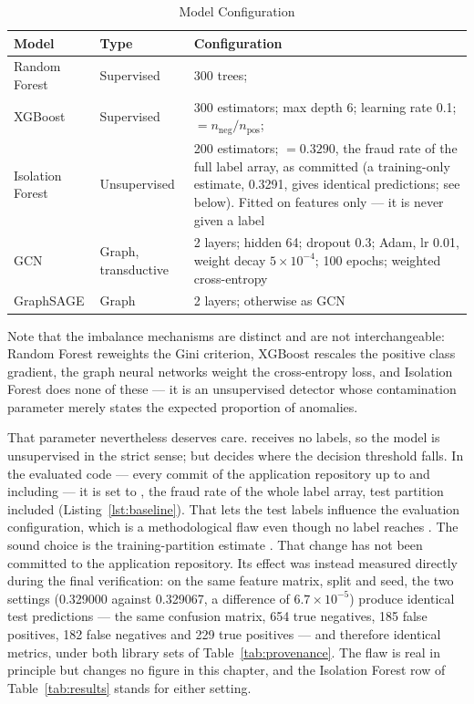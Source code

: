 \begin{table}[htbp]
\centering
\caption{Model Configuration}
\label{tab:modelconfig}
\small
\begin{tabularx}{\textwidth}{@{}L{2.7cm}L{3.0cm}Y@{}}
\toprule
\textbf{Model} & \textbf{Type} & \textbf{Configuration} \\
\midrule
Random Forest & Supervised & 300 trees;  \\
XGBoost & Supervised & 300 estimators; max depth 6; learning rate 0.1;  $= n_{\mathrm{neg}}/n_{\mathrm{pos}}$;  \\
Isolation Forest & Unsupervised & 200 estimators;  $= 0.3290$, the fraud rate of the full label array, as committed (a training-only estimate, 0.3291, gives identical predictions; see below). Fitted on features only --- it is never given a label \\
GCN & Graph, transductive & 2  layers; hidden 64; dropout 0.3; Adam, lr 0.01, weight decay $5\times10^{-4}$; 100 epochs; weighted cross-entropy \\
GraphSAGE & Graph & 2  layers; otherwise as GCN \\
\bottomrule
\end{tabularx}
\end{table}

Note that the imbalance mechanisms are distinct and are not interchangeable: Random Forest reweights the Gini criterion, XGBoost rescales the positive class gradient, the graph neural networks weight the cross-entropy loss, and Isolation Forest does none of these --- it is an unsupervised detector whose contamination parameter merely states the expected proportion of anomalies.

That parameter nevertheless deserves care.  receives no labels, so the model is unsupervised in the strict sense; but  decides where the decision threshold falls. In the evaluated code --- every commit of the application repository up to and including  --- it is set to , the fraud rate of the whole label array, test partition included (Listing~\ref{lst:baseline}). That lets the test labels influence the evaluation configuration, which is a methodological flaw even though no label reaches . The sound choice is the training-partition estimate . That change has not been committed to the application repository. Its effect was instead measured directly during the final verification: on the same feature matrix, split and seed, the two settings (0.329000 against 0.329067, a difference of $6.7\times10^{-5}$) produce identical test predictions --- the same confusion matrix, 654 true negatives, 185 false positives, 182 false negatives and 229 true positives --- and therefore identical metrics, under both library sets of Table~\ref{tab:provenance}. The flaw is real in principle but changes no figure in this chapter, and the Isolation Forest row of Table~\ref{tab:results} stands for either setting.

